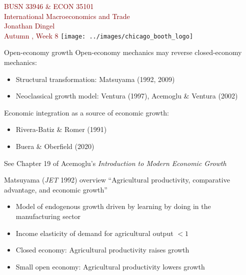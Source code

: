\documentclass[10pt,notes=hide]{beamer}
\begin{document}
\begin{frame}[plain]
\begin{center}
\large
\textcolor{maroon}{BUSN 33946 \& ECON 35101\\
International Macroeconomics and Trade\\ 
Jonathan Dingel\\
Autumn \the\year, Week 8}
\vfill 
\texttt{[image: ../images/chicago\_booth\_logo]}
\end{center}
\end{frame}
\begin{frame}{Open-economy growth}
Open-economy mechanics may reverse closed-economy mechanics:
\begin{itemize}
\item Structural transformation: Matsuyama (1992, 2009)
\item Neoclassical growth model: Ventura (1997), Acemoglu \& Ventura (2002)
\end{itemize}
\vspace{5mm}
Economic integration as a source of economic growth:
\begin{itemize}
\item Rivera-Batiz \& Romer (1991) \item Buera \& Oberfield (2020)
\end{itemize}
\vspace{1cm}
See Chapter 19 of Acemoglu's \textit{Introduction to Modern Economic Growth}
\end{frame}
\begin{frame}{Matsuyama (\textit{JET} 1992) overview}
{\small ``Agricultural productivity, comparative advantage, and economic growth''}
\begin{itemize}
\item Model of endogenous growth driven by learning by doing in the manufacturing sector
\item Income elasticity of demand for agricultural output $<1$
\item Closed economy: Agricultural productivity raises growth
\item Small open economy: Agricultural productivity lowers growth
\end{itemize}
\end{frame}
\end{document}
